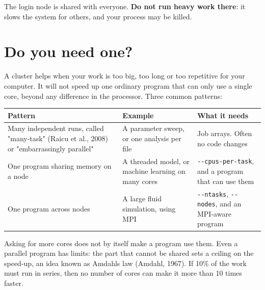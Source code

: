 The login node is shared with everyone. \textbf{Do not run heavy work there}: it slows the system for others, and your process may be killed.

\section{Do you need one?}\label{do-you-need-one}

A cluster helps when your work is too big, too long or too repetitive for your computer. It will not speed up one ordinary program that can only use a single core, beyond any difference in the processor. Three common patterns:

{\def\LTcaptype{none} %
\begin{longtable}[]{@{}
  >{\raggedright\arraybackslash}p{}
  >{\raggedright\arraybackslash}p{}
  >{\raggedright\arraybackslash}p{}@{}}
\toprule\noalign{}
\begin{minipage}[b]{\linewidth}\raggedright
Pattern
\end{minipage} & \begin{minipage}[b]{\linewidth}\raggedright
Example
\end{minipage} & \begin{minipage}[b]{\linewidth}\raggedright
What it needs
\end{minipage} \\
\midrule\noalign{}
\endhead
\bottomrule\noalign{}
\endlastfoot
Many independent runs, called "many-task" (Raicu et al., 2008) or "embarrassingly parallel" & A parameter sweep, or one analysis per file & Job arrays. Often no code changes \\
One program sharing memory on a node & A threaded model, or machine learning on many cores & \texttt{-\/-cpus-per-task}, and a program that can use them \\
One program across nodes & A large fluid simulation, using MPI & \texttt{-\/-ntasks}, \texttt{-\/-nodes}, and an MPI-aware program \\
\end{longtable}
}

Asking for more cores does not by itself make a program use them. Even a parallel program has limits: the part that cannot be shared sets a ceiling on the speed-up, an idea known as Amdahl\textquotesingle s law (Amdahl, 1967). If 10\% of the work must run in series, then no number of cores can make it more than 10 times faster.

